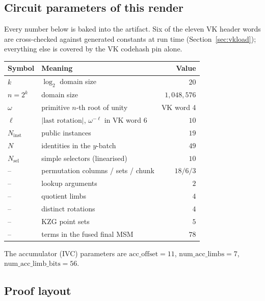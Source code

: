 \documentclass[11pt,a4paper]{article}
\theoremstyle{definition}
\begin{document}
\subsection{Circuit parameters of this render}

Every number below is baked into the artifact. Six of the eleven VK header
words are cross-checked against generated constants at run time
(Section~\ref{sec:vkload}); everything else is covered by the VK codehash pin
alone.

\begin{center}
\begin{tabular}{@{}llr@{}}
\toprule
Symbol & Meaning & Value \\
\midrule
$k$                & $\log_2$ domain size            & $20$ \\
$n = 2^{k}$        & domain size                     & $1{,}048{,}576$ \\
$\omega$           & primitive $n$-th root of unity  & VK word 4 \\
$\ell$             & $|{\text{last rotation}}|$, $\omega^{-\ell}$ in VK word 6 & $10$ \\
$N_{\mathrm{inst}}$& public instances                & $19$ \\
$N$                & identities in the $y$-batch     & $49$ \\
$N_{\mathrm{sel}}$ & simple selectors (linearised)   & $10$ \\
--                 & permutation columns / sets / chunk & $18 / 6 / 3$ \\
--                 & lookup arguments                & $2$ \\
--                 & quotient limbs                  & $4$ \\
--                 & distinct rotations              & $4$ \\
--                 & KZG point sets                  & $5$ \\
--                 & terms in the fused final MSM    & $78$ \\
\bottomrule
\end{tabular}
\end{center}

The accumulator (IVC) parameters are
$\mathrm{acc\_offset}=11$, $\mathrm{num\_acc\_limbs}=7$,
$\mathrm{num\_acc\_limb\_bits}=56$.

\subsection{Proof layout}
\end{document}
